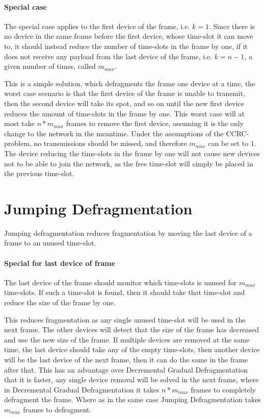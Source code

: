 \paragraph{Special case}
The special case applies to the first device of the frame, i.e. $k = 1$. 
Since there is no device in the same frame before the first device, whose time-slot it can move to, it should instead reduce the number of time-slots in the frame by one, if it does not receive any payload from the last device of the frame, i.e. $k = n - 1$, a given number of times, called $m_{max}$. 

\bigskip

This is a simple solution, which defragments the frame one device at a time, the worst case scenario is that the first device of the frame is unable to transmit, then the second device will take its spot, and so on until the new first device reduces the amount of time-slots in the frame by one. 
This worst case will at most take $n * m_{max}$ frames to remove the first device, assuming it is the only change to the network in the meantime. 
Under the assumptions of the CCRC-problem, no transmissions should be missed, and therefore $m_{max}$ can be set to $1$. 
The device reducing the time-slots in the frame by one will not cause new devices not to be able to join the network, as the free time-slot will simply be placed in the previous time-slot. 

\section{Jumping Defragmentation}
Jumping defragmentation reduces fragmentation by moving the last device of a frame to an unused time-slot.

\paragraph{Special for last device of frame}
The last device of the frame should monitor which time-slots is unused for $m_{max}$ time-slots. 
If such a time-slot is found, then it should take that time-slot and reduce the size of the frame by one.

\bigskip

This reduces fragmentation as any single unused time-slot will be used in the next frame.
The other devices will detect that the size of the frame has decreased and use the new size of the frame. 
If multiple devices are removed at the same time, the last device should take any of the empty time-slots, then another device will be the last device of the next frame, then it can do the same in the frame after that. 
This has an advantage over Decremental Gradual Defragmentation that it is faster, any single device removal will be solved in the next frame, where in Decremental Gradual Defragmentation it takes $n * m_{max}$ frames to completely defragment the frame. 
Where as in the same case Jumping Defragmentation takes $m_{max}$ frames to defragment. 

